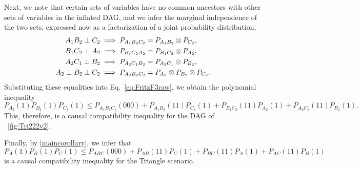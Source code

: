 Next, we note that certain sets of variables have no common ancestors with other sets of variables in the inflated DAG, and we infer the marginal independence of the two sets, expressed now as a factorization of a joint probability distribution,
\begin{align}\begin{split}\label{eq:tri222fac}
A_1 B_2 \perp C_2 \implies	P_{A_1 B_2 C_2} &= P_{A_1 B_2} \otimes P_{C_2}, \\
B_1 C_2 \perp A_2 \implies	P_{B_1 C_2 A_2} &= P_{B_1 C_2} \otimes P_{A_2}, \\
A_2 C_1 \perp B_2 \implies	P_{A_2 C_1 B_2} &= P_{A_2 C_1} \otimes P_{B_2}, \\
A_2 \perp B_2 \perp C_2 \implies	P_{A_2 B_2 C_2} &= P_{A_2} \otimes P_{B_2} \otimes P_{C_2} .
\end{split}\end{align}
Substituting these equalities into Eq.~\eqref{eq:FritzF3raw}, we obtain the polynomial inequality
\begin{equation}%
	P_{A_2}(1) P_{B_2}(1) P_{C_2}(1) \leq P_{A_1 B_1 C_1 }(000) + P_{A_1 B_2}(11) P_{C_2}(1) + P_{B_1 C_2}(11) P_{A_2}(1) + P_{A_2 C_1}(11) P_{B_2}(1).
\end{equation}
This, therefore, is a causal compatibility inequality for the DAG of ~\cref{fig:Tri222v2}.  

Finally, by \cref{maincorollary}, we infer that 
\begin{equation}\label{eq:FritzF3}
	P_{A}(1) P_{B}(1) P_{C}(1) \leq P_{ABC}(000) + P_{AB}(11) P_C(1) + P_{BC}(11) P_A(1) + P_{AC}(11) P_B(1)
\end{equation}
is a causal compatibility inequality for the Triangle scenario.  


